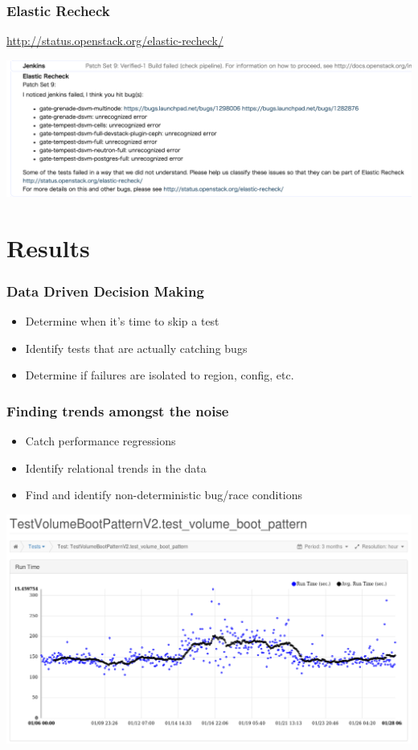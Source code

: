 \documentclass[aspectratio=43,11pt,hyperref={colorlinks=true}]{beamer}
\begin{document}
\begin{frame}
    \frametitle{Elastic Recheck}
    \href{http://status.openstack.org/elastic-recheck/}{http://status.openstack.org/elastic-recheck/}
  \begin{center}
    \includegraphics[width=.9\textwidth]{elastic-recheck-sample.png}
  \end{center}
\end{frame}


\section{Results}
\begin{frame}
    \frametitle{Data Driven Decision Making}
    \begin{itemize}
        \item Determine when it's time to skip a test
        \item Identify tests that are actually catching bugs
        \item Determine if failures are isolated to region, config, etc.
    \end{itemize}
\end{frame}

\begin{frame}
    \frametitle{Finding trends amongst the noise}
    \begin{itemize}
        \item Catch performance regressions
        \item Identify relational trends in the data
        \item Find and identify non-deterministic bug/race conditions
    \end{itemize}
    \begin{center}
        \includegraphics[height=.7\textheight]{Performance-Issue-o-h.png}
    \end{center}
\end{frame}
\end{document}
